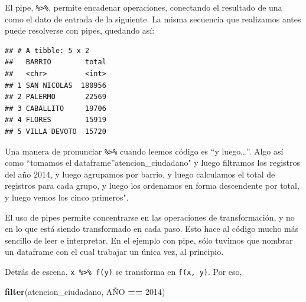 \documentclass[spanish,]{book}
\newenvironment{Shaded}{\begin{snugshade}}{\end{snugshade}}
\newcommand{\DataTypeTok}[1]{\textcolor[rgb]{0.13,0.29,0.53}{#1}}
\newcommand{\DecValTok}[1]{\textcolor[rgb]{0.00,0.00,0.81}{#1}}
\newcommand{\KeywordTok}[1]{\textcolor[rgb]{0.13,0.29,0.53}{\textbf{#1}}}
\newcommand{\NormalTok}[1]{#1}
\newcommand{\OperatorTok}[1]{\textcolor[rgb]{0.81,0.36,0.00}{\textbf{#1}}}
\newcommand{\StringTok}[1]{\textcolor[rgb]{0.31,0.60,0.02}{#1}}
\begin{document}
El pipe, \texttt{\%\textgreater{}\%}, permite encadenar operaciones, conectando el resultado de una como el dato de entrada de la siguiente. La misma secuencia que realizamos antes puede resolverse con pipes, quedando así:

\begin{Shaded}
\end{Shaded}

\begin{verbatim}
## # A tibble: 5 x 2
##   BARRIO        total
##   <chr>         <int>
## 1 SAN NICOLAS  180956
## 2 PALERMO       22569
## 3 CABALLITO     19706
## 4 FLORES        15919
## 5 VILLA DEVOTO  15720
\end{verbatim}

Una manera de pronunciar \texttt{\%\textgreater{}\%} cuando leemos código es ``y luego\ldots{}''. Algo así como ``tomamos el dataframe''atencion\_ciudadano" y luego filtramos los registros del año 2014, y luego agrupamos por barrio, y luego calculamos el total de registros para cada grupo, y luego los ordenamos en forma descendente por total, y luego vemos los cinco primeros".

El uso de pipes permite concentrarse en las operaciones de transformación, y no en lo que está siendo transformado en cada paso. Esto hace al código mucho más sencillo de leer e interpretar. En el ejemplo con pipe, sólo tuvimos que nombrar un dataframe con el cual trabajar un única vez, al principio.

Detrás de escena, \texttt{x\ \%\textgreater{}\%\ f(y)} se transforma en \texttt{f(x,\ y)}. Por eso,

\begin{Shaded}
\begin{Highlighting}[]
\KeywordTok{filter}\NormalTok{(atencion_ciudadano, AÑO }\OperatorTok{==}\StringTok{ }\DecValTok{2014}\NormalTok{)}
\end{Highlighting}
\end{Shaded}
\end{document}
